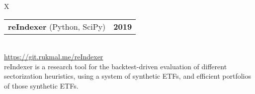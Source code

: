 \documentclass[10pt]{article}
\newcommand{\tabularxwidth}{\textwidth}
\begin{document}
        \begin{tabularx}{\tabularxwidth}{X}
                {
                    \begin{tabularx}{\tabularxwidth}{@{}X r}
                        \textbf{reIndexer}
                            (Python, SciPy)
                        &
                        \textbf{
        2019} \\
                    \end{tabularx}
                } \\

            

            

            
                \url{https://git.rukmal.me/reIndexer} \\
            

            
    reIndexer is a research tool for the backtest-driven evaluation of different sectorization heuristics, using a system of synthetic ETFs, and efficient portfolios of those synthetic ETFs. \\

        \end{tabularx}

        
            \vspace{.5em}
        

    
\end{document}
